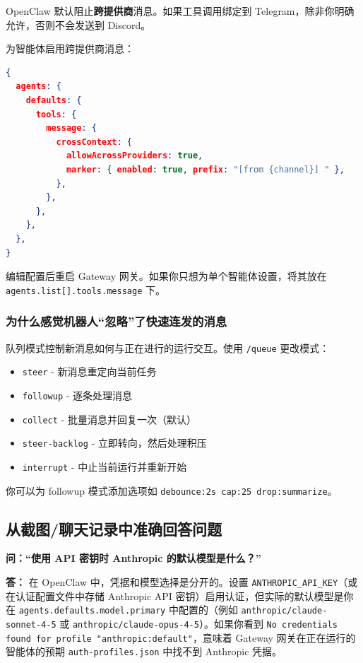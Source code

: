 OpenClaw 默认阻止\textbf{跨提供商}消息。如果工具调用绑定到 Telegram，除非你明确允许，否则不会发送到 Discord。

为智能体启用跨提供商消息：

\begin{lstlisting}[language=json]
{
  agents: {
    defaults: {
      tools: {
        message: {
          crossContext: {
            allowAcrossProviders: true,
            marker: { enabled: true, prefix: "[from {channel}] " },
          },
        },
      },
    },
  },
}
\end{lstlisting}


编辑配置后重启 Gateway 网关。如果你只想为单个智能体设置，将其放在 \texttt{agents.list[].tools.message} 下。

\subsubsection{为什么感觉机器人“忽略”了快速连发的消息}


队列模式控制新消息如何与正在进行的运行交互。使用 \texttt{/queue} 更改模式：

\begin{itemize}
  \item \texttt{steer} - 新消息重定向当前任务
  \item \texttt{followup} - 逐条处理消息
  \item \texttt{collect} - 批量消息并回复一次（默认）
  \item \texttt{steer-backlog} - 立即转向，然后处理积压
  \item \texttt{interrupt} - 中止当前运行并重新开始
\end{itemize}


你可以为 followup 模式添加选项如 \texttt{debounce:2s cap:25 drop:summarize}。

\subsection{从截图/聊天记录中准确回答问题}


\textbf{问：“使用 API 密钥时 Anthropic 的默认模型是什么？”}

\textbf{答：} 在 OpenClaw 中，凭据和模型选择是分开的。设置 \texttt{ANTHROPIC\_API\_KEY}（或在认证配置文件中存储 Anthropic API 密钥）启用认证，但实际的默认模型是你在 \texttt{agents.defaults.model.primary} 中配置的（例如 \texttt{anthropic/claude-sonnet-4-5} 或 \texttt{anthropic/claude-opus-4-5}）。如果你看到 \texttt{No credentials found for profile "anthropic:default"}，意味着 Gateway 网关在正在运行的智能体的预期 \texttt{auth-profiles.json} 中找不到 Anthropic 凭据。

